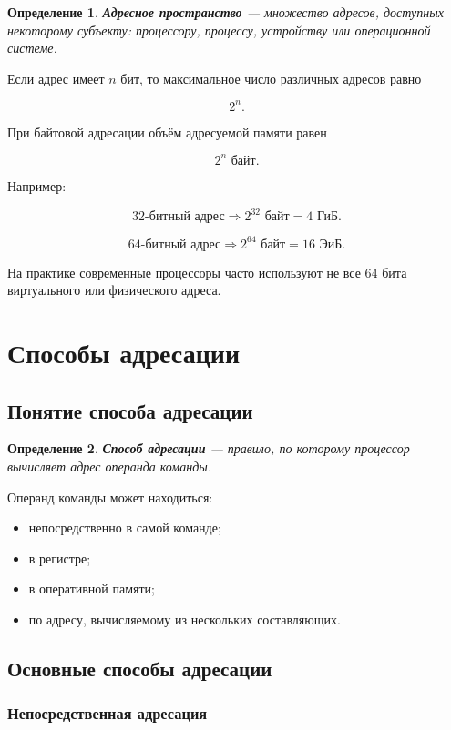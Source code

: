 \documentclass[a4paper,12pt]{article}
\newtheorem{definition}{Определение}
\begin{document}
\begin{definition}
\textbf{Адресное пространство} --- множество адресов, доступных некоторому субъекту: процессору, процессу, устройству или операционной системе.
\end{definition}

Если адрес имеет $n$ бит, то максимальное число различных адресов равно

\[
2^n.
\]

При байтовой адресации объём адресуемой памяти равен

\[
2^n \text{ байт}.
\]

Например:

\[
32\text{-битный адрес} \Rightarrow 2^{32} \text{ байт} = 4 \text{ ГиБ}.
\]

\[
64\text{-битный адрес} \Rightarrow 2^{64} \text{ байт} = 16 \text{ ЭиБ}.
\]

На практике современные процессоры часто используют не все 64 бита виртуального или физического адреса.

\section{Способы адресации}

\subsection{Понятие способа адресации}

\begin{definition}
\textbf{Способ адресации} --- правило, по которому процессор вычисляет адрес операнда команды.
\end{definition}

Операнд команды может находиться:

\begin{itemize}
    \item непосредственно в самой команде;
    \item в регистре;
    \item в оперативной памяти;
    \item по адресу, вычисляемому из нескольких составляющих.
\end{itemize}

\subsection{Основные способы адресации}

\subsubsection{Непосредственная адресация}
\end{document}
